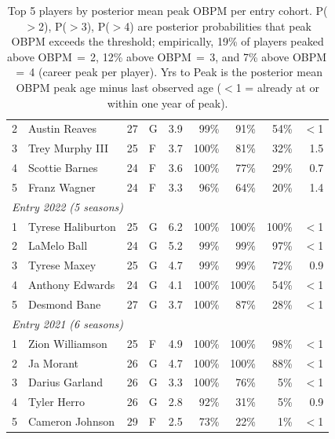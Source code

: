 \begin{table}[htbp]
\begin{tabular}{rlrlrrrrr}
    2 & Austin Reaves & 27 & G & 3.9 & 99\% & 91\% & 54\% & $<$1 \\
    3 & Trey Murphy III & 25 & F & 3.7 & 100\% & 81\% & 32\% & 1.5 \\
    4 & Scottie Barnes & 24 & F & 3.6 & 100\% & 77\% & 29\% & 0.7 \\
    5 & Franz Wagner & 24 & F & 3.3 & 96\% & 64\% & 20\% & 1.4 \\
    \midrule[0.4pt]
    \multicolumn{9}{l}{\textit{Entry 2022 (5 seasons)}} \\
    \midrule
    1 & Tyrese Haliburton & 25 & G & 6.2 & 100\% & 100\% & 100\% & $<$1 \\
    2 & LaMelo Ball & 24 & G & 5.2 & 99\% & 99\% & 97\% & $<$1 \\
    3 & Tyrese Maxey & 25 & G & 4.7 & 99\% & 99\% & 72\% & 0.9 \\
    4 & Anthony Edwards & 24 & G & 4.1 & 100\% & 100\% & 54\% & $<$1 \\
    5 & Desmond Bane & 27 & G & 3.7 & 100\% & 87\% & 28\% & $<$1 \\
    \midrule[0.4pt]
    \multicolumn{9}{l}{\textit{Entry 2021 (6 seasons)}} \\
    \midrule
    1 & Zion Williamson & 25 & F & 4.9 & 100\% & 100\% & 98\% & $<$1 \\
    2 & Ja Morant & 26 & G & 4.7 & 100\% & 100\% & 88\% & $<$1 \\
    3 & Darius Garland & 26 & G & 3.3 & 100\% & 76\% & 5\% & $<$1 \\
    4 & Tyler Herro & 26 & G & 2.8 & 92\% & 31\% & 5\% & 0.9 \\
    5 & Cameron Johnson & 29 & F & 2.5 & 73\% & 22\% & 1\% & $<$1 \\
    \bottomrule
  \end{tabular}
  \caption{Top 5 players by posterior mean peak OBPM per entry cohort. P($>$2), P($>$3), P($>$4) are posterior probabilities that peak OBPM exceeds the threshold; empirically, 19\% of players peaked above OBPM\,$=$\,2, 12\% above OBPM\,$=$\,3, and 7\% above OBPM\,$=$\,4 (career peak per player). Yrs to Peak is the posterior mean OBPM peak age minus last observed age ($<$1 = already at or within one year of peak).}
  \label{tab:breakout_cohort}
\end{table}

